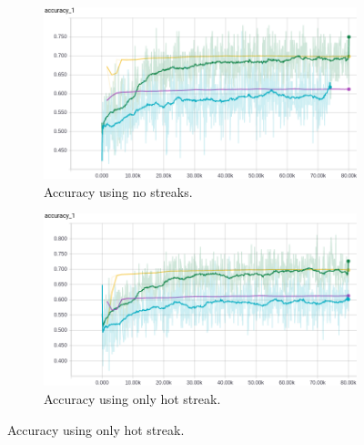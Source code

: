 \documentclass{article} %
\begin{document}
\begin{figure}[!htb]
  \begin{subfigure}{0.5\textwidth}
    \includegraphics[width=\linewidth]{plots/model2/streak-/accuracy.png}
    \caption{Accuracy using no streaks.}\label{fig:model2--accuracy}
  \end{subfigure}
  \begin{subfigure}{0.5\textwidth}
    \includegraphics[width=\linewidth]{plots/model2/streak-h/accuracy.png}
    \caption{Accuracy using only hot streak.}\label{fig:model2-h-accuracy}
  \end{subfigure}



\end{figure}
\end{document}
